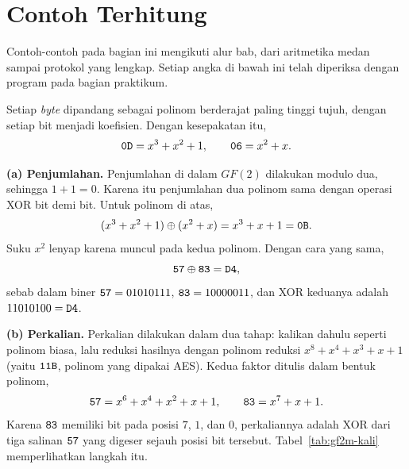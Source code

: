 \section{Contoh Terhitung}
\label{sec:contoh-ecc}

Contoh-contoh pada bagian ini mengikuti alur bab, dari aritmetika medan sampai
protokol yang lengkap. Setiap angka di bawah ini telah diperiksa dengan program
pada bagian praktikum.

\begin{example}
\label{ex:gf2m}
Setiap \textit{byte} dipandang sebagai polinom berderajat paling tinggi tujuh,
dengan setiap bit menjadi koefisien. Dengan kesepakatan itu,
\[
\texttt{0D} = x^3 + x^2 + 1,
\qquad
\texttt{06} = x^2 + x .
\]

\textbf{(a) Penjumlahan.} Penjumlahan di dalam $GF(2)$ dilakukan modulo dua,
sehingga $1 + 1 = 0$. Karena itu penjumlahan dua polinom sama dengan operasi
XOR bit demi bit. Untuk polinom di atas,
\[
(x^3 + x^2 + 1) \oplus (x^2 + x) = x^3 + x + 1 = \texttt{0B} .
\]
Suku $x^2$ lenyap karena muncul pada kedua polinom. Dengan cara yang sama,
\[
\texttt{57} \oplus \texttt{83} = \texttt{D4} ,
\]
sebab dalam biner $\texttt{57} = 01010111$, $\texttt{83} = 10000011$, dan XOR
keduanya adalah $11010100 = \texttt{D4}$.

\textbf{(b) Perkalian.} Perkalian dilakukan dalam dua tahap: kalikan dahulu
seperti polinom biasa, lalu reduksi hasilnya dengan polinom reduksi
$x^8 + x^4 + x^3 + x + 1$ (yaitu $\texttt{11B}$, polinom yang dipakai AES).
Kedua faktor ditulis dalam bentuk polinom,
\[
\texttt{57} = x^6 + x^4 + x^2 + x + 1,
\qquad
\texttt{83} = x^7 + x + 1 .
\]
Karena $\texttt{83}$ memiliki bit pada posisi $7$, $1$, dan $0$, perkaliannya
adalah XOR dari tiga salinan $\texttt{57}$ yang digeser sejauh posisi bit
tersebut. Tabel~\ref{tab:gf2m-kali} memperlihatkan langkah itu.


\end{example}

